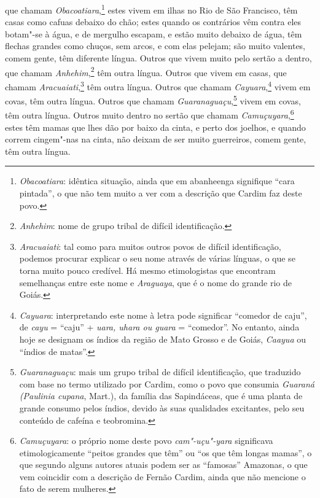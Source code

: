 que chamam \textit{Obacoatiara},\footnote{ \textit{Obacoatiara}: 
idêntica situação, ainda que em abanheenga signifique ``cara pintada'',
o que não tem muito a ver com a descrição que Cardim faz deste povo.}
estes vivem em ilhas no Rio de São Francisco, têm casas como
cafuas debaixo do chão; estes quando os contrários vêm contra eles
botam"-se à água, e de mergulho escapam, e estão muito debaixo de água,
têm flechas grandes como chuços, sem arcos, e com elas pelejam; são
muito valentes, comem gente, têm diferente língua. Outros que vivem
muito pelo sertão a dentro, que chamam \textit{Anhehim},\footnote{ \textit{Anhehim}: 
nome de grupo tribal de difícil
identificação.} têm outra língua. Outros que vivem em casas,
que chamam \textit{Aracuaiati},\footnote{ \textit{Aracuaiati}: tal
como para muitos outros povos de difícil identificação, podemos
procurar explicar o seu nome através de várias línguas, o que se torna
muito pouco credível. Há mesmo etimologistas que encontram semelhanças
entre este nome e \textit{Araguaya}, que é o nome do grande rio de
Goiás.} têm outra língua. Outros que chamam \textit{Cayuara},\footnote{ \textit{Cayuara}: 
interpretando este nome à letra pode
significar ``comedor de caju'', de \textit{cayu} = ``caju'' + \textit{uara,
uhara ou guara} = ``comedor''. No entanto, ainda hoje se designam os
índios da região de Mato Grosso e de Goiás, \textit{Caayua} ou ``índios
de matas''.} vivem em covas, têm outra língua. Outros que
chamam \textit{Guaranaguaçu},\footnote{ \textit{Guaranaguaçu}: mais
um grupo tribal de difícil identificação, que traduzido com base no
termo utilizado por Cardim, como o povo que consumia \textit{Guaraná
(Paulinia cupana}, Mart.), da família das Sapindáceas, que é uma planta
de grande consumo pelos índios, devido às suas qualidades excitantes,
pelo seu conteúdo de cafeína e teobromina.} vivem em covas,
têm outra língua. Outros muito dentro no sertão que chamam
\textit{Camuçuyara},\footnote{ \textit{Camuçuyara}: o próprio nome
deste povo \textit{cam"-uçu"-yara} significava etimologicamente ``peitos
grandes que têm'' ou ``os que têm longas mamas'', o que segundo alguns
autores atuais podem ser as ``famosas'' Amazonas, o que vem
coincidir com a descrição de Fernão Cardim, ainda que não mencione o
fato de serem mulheres.} estes têm mamas que lhes dão por
baixo da cinta, e perto dos joelhos, e quando correm cingem"-nas na
cinta, não deixam de ser muito guerreiros, comem gente, têm outra língua. 

